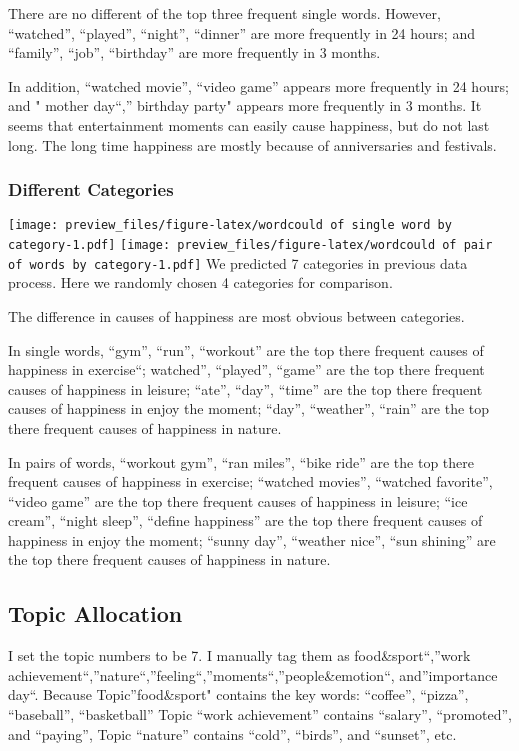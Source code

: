 \documentclass[]{article}
\begin{document}
There are no different of the top three frequent single words. However,
``watched'', ``played'', ``night'', ``dinner'' are more frequently in 24
hours; and ``family'', ``job'', ``birthday'' are more frequently in 3
months.

In addition, ``watched movie'', ``video game'' appears more frequently
in 24 hours; and " mother day``,'' birthday party" appears more
frequently in 3 months. It seems that entertainment moments can easily
cause happiness, but do not last long. The long time happiness are
mostly because of anniversaries and festivals.

\subsubsection{Different Categories}\label{different-categories}

\texttt{[image: preview\_files/figure-latex/wordcould of single word by category-1.pdf]}
\texttt{[image: preview\_files/figure-latex/wordcould of pair of words by category-1.pdf]}
We predicted 7 categories in previous data process. Here we randomly
chosen 4 categories for comparison.

The difference in causes of happiness are most obvious between
categories.

In single words, ``gym'', ``run'', ``workout'' are the top there
frequent causes of happiness in exercise``; watched'', ``played'',
``game'' are the top there frequent causes of happiness in leisure;
``ate'', ``day'', ``time'' are the top there frequent causes of
happiness in enjoy the moment; ``day'', ``weather'', ``rain'' are the
top there frequent causes of happiness in nature.

In pairs of words, ``workout gym'', ``ran miles'', ``bike ride'' are the
top there frequent causes of happiness in exercise; ``watched movies'',
``watched favorite'', ``video game'' are the top there frequent causes
of happiness in leisure; ``ice cream'', ``night sleep'', ``define
happiness'' are the top there frequent causes of happiness in enjoy the
moment; ``sunny day'', ``weather nice'', ``sun shining'' are the top
there frequent causes of happiness in nature.

\subsection{Topic Allocation}\label{topic-allocation}

I set the topic numbers to be 7. I manually tag them as
food\&sport``,''work
achievement``,''nature``,''feeling``,''moments``,''people\&emotion``,
and''importance day``. Because Topic''food\&sport" contains the key
words: ``coffee'', ``pizza'', ``baseball'', ``basketball'' Topic ``work
achievement'' contains ``salary'', ``promoted'', and ``paying'', Topic
``nature'' contains ``cold'', ``birds'', and ``sunset'', etc.
\end{document}
